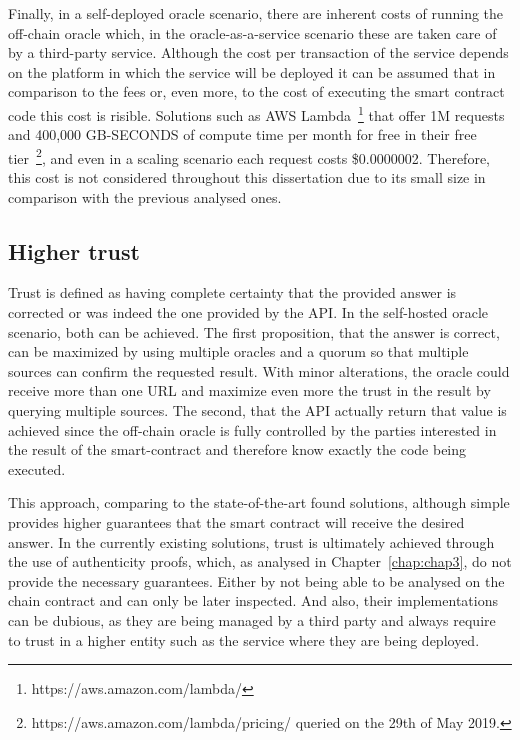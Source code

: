 Finally, in a self-deployed oracle scenario, there are inherent costs of running the off-chain oracle which, in the oracle-as-a-service scenario these are taken care of by a third-party service. Although the cost per transaction of the service depends on the platform in which the service will be deployed it can be assumed that in comparison to the fees or, even more, to the cost of executing the smart contract code this cost is risible. Solutions such as AWS Lambda~\footnote{https://aws.amazon.com/lambda/} that offer 1M requests and 400,000 GB-SECONDS of compute time per month for free in their free tier~\footnote{https://aws.amazon.com/lambda/pricing/ queried on the 29th of May 2019.}, and even in a scaling scenario each request costs \$0.0000002. Therefore, this cost is not considered throughout this dissertation due to its small size in comparison with the previous analysed ones.

\subsection{Higher trust}

Trust is defined as having complete certainty that the provided answer is corrected or was indeed the one provided by the API. In the self-hosted oracle scenario, both can be achieved. The first proposition, that the answer is correct, can be maximized by using multiple oracles and a quorum so that multiple sources can confirm the requested result. With minor alterations, the oracle could receive more than one URL and maximize even more the trust in the result by querying multiple sources. The second, that the API actually return that value is achieved since the off-chain oracle is fully controlled by the parties interested in the result of the smart-contract and therefore know exactly the code being executed.

This approach, comparing to the state-of-the-art found solutions, although simple provides higher guarantees that the smart contract will receive the desired answer. In the currently existing solutions, trust is ultimately achieved through the use of authenticity proofs, which, as analysed in Chapter~\ref{chap:chap3}, do not provide the necessary guarantees. Either by not being able to be analysed on the chain contract and can only be later inspected. And also, their implementations can be dubious, as they are being managed by a third party and always require to trust in a higher entity such as the service where they are being deployed.

